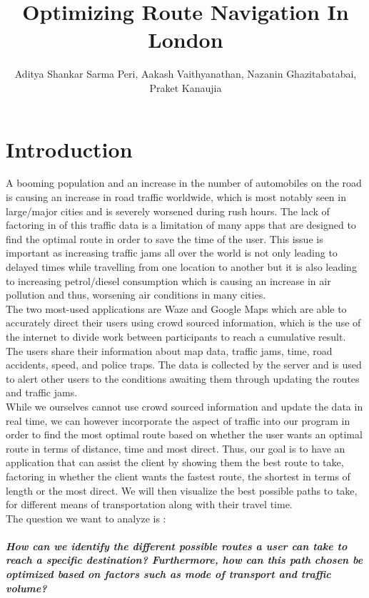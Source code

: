 \documentclass[fontsize=11pt]{IEEEtran}
\title{\textbf{Optimizing Route Navigation In London}}
\author{Aditya Shankar Sarma Peri, Aakash Vaithyanathan, Nazanin Ghazitabatabai, Praket Kanaujia}  \\
\begin{document}
\maketitle

\section{\textbf{Introduction}}
A booming population and an increase in the number of automobiles on the road is causing an increase in road traffic worldwide, which is most notably seen in large/major cities and is severely worsened during rush hours. The lack of factoring in of this traffic data is a limitation of many apps that are designed to find the optimal route in order to save the time of the user. This issue is important as increasing traffic jams all over the world is not only leading to delayed times while travelling from one location to another but it is also leading to increasing petrol/diesel consumption which is causing an increase in air pollution and thus, worsening air conditions in many cities.\\

The two most-used applications are Waze and Google Maps which are able to accurately direct their users using crowd sourced information, which is the use of the internet to divide  work  between  participants to reach a cumulative result.\cite{1} The users share their information about map data, traffic jams, time, road accidents, speed, and police traps. The data is collected by the server and is used to alert other users to the conditions awaiting them through updating the routes and traffic jams.\\

While we ourselves cannot use crowd sourced information and update the data in real time, we can however incorporate the aspect of traffic into our program in order to find the most optimal route based on whether the user wants an optimal route in terms of distance, time and most direct. Thus, our goal is to have an application that can assist the client by showing them the best route to take, factoring in whether the client wants the fastest route, the shortest in terms of length or the most direct. We will then visualize the  best  possible paths to take, for different means of transportation along with their travel time. \\

The question we want to analyze is :\\ \\ \textbf{\textit{How can we identify the different possible routes a user can take to reach a specific destination? Furthermore, how can this path chosen be optimized based on factors such as mode of transport and traffic volume?}}
\end{document}
